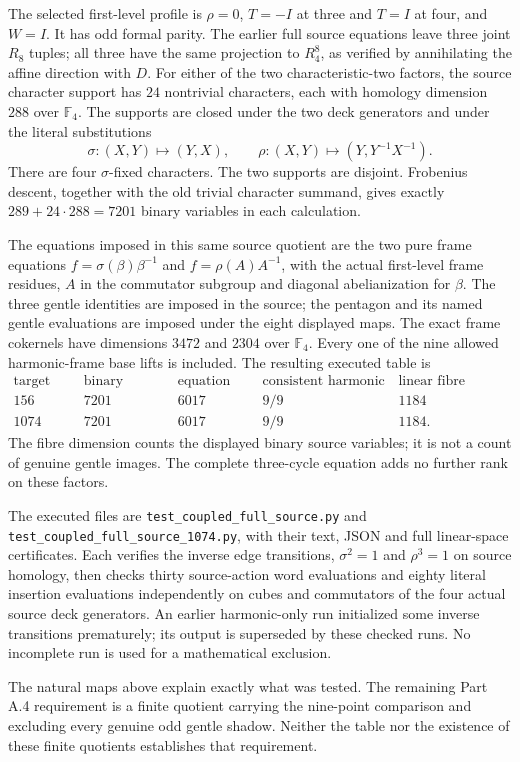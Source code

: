 The selected first-level profile is
$\rho=0$, $T=-I$ at three and $T=I$ at four, and $W=I$.
It has odd formal parity.  The earlier full source equations leave
three joint $R_8$ tuples; all three have the same projection to
$R_4^8$, as verified by annihilating the affine direction with $D$.
For either of the two characteristic-two factors, the source
character support has $24$ nontrivial characters, each with
homology dimension $288$ over $\mathbb F_4$.  The supports are
closed under the two deck generators and under the literal
substitutions
\[
 \sigma:(X,Y)\mapsto(Y,X),\qquad
 \rho:(X,Y)\mapsto(Y,Y^{-1}X^{-1}).
\]
There are four $\sigma$-fixed characters.  The two supports are
disjoint.  Frobenius descent, together with the old trivial
character summand, gives exactly
$289+24\cdot288=7201$ binary variables in each calculation.

The equations imposed in this same source quotient are the two
pure frame equations
$f=\sigma(\beta)\beta^{-1}$ and $f=\rho(A)A^{-1}$,
with the actual first-level frame residues, $A$ in the commutator
subgroup and diagonal abelianization for $\beta$.  The three gentle
identities are imposed in the source; the pentagon and its named
gentle evaluations are imposed under the eight displayed maps.
The exact frame cokernels have dimensions $3472$ and $2304$ over
$\mathbb F_4$.  Every one of the nine allowed harmonic-frame base
lifts is included.  The resulting executed table is
\[
\begin{array}{c|r|r|r|r}
 \text{target orbit}&\text{binary variables}&\text{equation rank}
 &\text{consistent harmonic bases}&\text{linear fibre dimension}\\ \hline
156&7201&6017&9/9&1184\\
1074&7201&6017&9/9&1184.
\end{array}
\]
The fibre dimension counts the displayed binary source variables;
it is not a count of genuine gentle images.  The complete
three-cycle equation adds no further rank on these factors.

The executed files are
\texttt{test\_coupled\_full\_source.py} and
\texttt{test\_coupled\_full\_source\_1074.py}, with their text,
JSON and full linear-space certificates.  Each verifies the
inverse edge transitions, $\sigma^2=1$ and $\rho^3=1$ on source
homology, then checks thirty source-action word evaluations and
eighty literal insertion evaluations independently on cubes and
commutators of the four actual source deck generators.
An earlier harmonic-only run initialized some inverse transitions
prematurely; its output is superseded by these checked runs.
No incomplete run is used for a mathematical exclusion.

The natural maps above explain exactly what was tested.  The
remaining Part A.4 requirement is a finite quotient carrying the
nine-point comparison and excluding every genuine odd gentle
shadow.  Neither the table nor the existence of these finite
quotients establishes that requirement.
